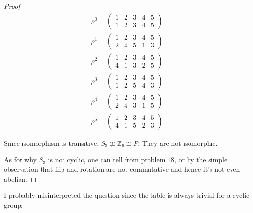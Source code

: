 \documentclass{article}
\begin{document}
\begin{itemize}
\begin{proof}
    \begin{equation*}
      \begin{split}
        \rho^0 =
        \begin{pmatrix}
          1 & 2 & 3 & 4 & 5\\
          1 & 2 & 3 & 4 & 5
        \end{pmatrix}\\
        \rho^1 =
        \begin{pmatrix}
          1 & 2 & 3 & 4 & 5\\
          2 & 4 & 5 & 1 & 3
        \end{pmatrix}\\
        \rho^2 =
        \begin{pmatrix}
          1 & 2 & 3 & 4 & 5\\
          4 & 1 & 3 & 2 & 5
        \end{pmatrix}\\
        \rho^3 =
        \begin{pmatrix}
          1 & 2 & 3 & 4 & 5\\
          1 & 2 & 5 & 4 & 3
        \end{pmatrix}\\
        \rho^4 =
        \begin{pmatrix}
          1 & 2 & 3 & 4 & 5\\
          2 & 4 & 3 & 1 & 5
        \end{pmatrix}\\
        \rho^5 =
        \begin{pmatrix}
          1 & 2 & 3 & 4 & 5\\
          4 & 1 & 5 & 2 & 3
        \end{pmatrix}
      \end{split}
    \end{equation*}

    Since isomorphism is transitive,
    $S_3 \ncong \mathbb{Z}_6 \cong P$. They are not isomorphic.

    As for why $S_3$ is not cyclic, one can tell from problem $18$, or
    by the simple observation that flip and rotation are not
    commutative and hence it's not even abelian.

  


  \end{proof}
    I probably
    misinterpreted the question since the table is always trivial for a
    cyclic group:
    

\end{itemize}
\end{document}
